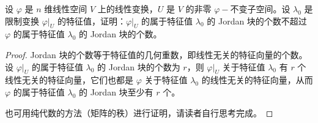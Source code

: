 \documentclass[../../main.tex]{subfiles}
\begin{document}
\begin{proposition}\label{proposition:限制变换的任一Jordan块的个数一定小于原线性变换的特征值对应的Jordan块的个数}
设 \(\varphi\) 是 \(n\) 维线性空间 \(V\) 上的线性变换，\(U\) 是 \(V\) 的非零 \(\varphi -\)不变子空间。设 \(\lambda_0\) 是限制变换 \(\varphi|_U\) 的特征值，证明：\(\varphi|_U\) 的属于特征值 \(\lambda_0\) 的 Jordan 块的个数不超过 \(\varphi\) 的属于特征值 \(\lambda_0\) 的 Jordan 块的个数。
\end{proposition}
\begin{proof}
Jordan 块的个数等于特征值的几何重数，即线性无关的特征向量的个数。设 \(\varphi|_U\) 的属于特征值 \(\lambda_0\) 的 Jordan 块的个数为 \(r\)，则 \(\varphi|_U\) 关于特征值 \(\lambda_0\) 有 \(r\) 个线性无关的特征向量，它们也都是 \(\varphi\) 关于特征值 \(\lambda_0\) 的线性无关的特征向量，从而 \(\varphi\) 的属于特征值 \(\lambda_0\) 的 Jordan 块至少有 \(r\) 个。

也可用纯代数的方法（矩阵的秩）进行证明，请读者自行思考完成。
\end{proof}
\end{document}
